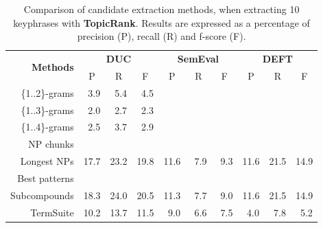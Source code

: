     \begin{table}[h]
      \centering
      \begin{tabular}{rccccccccc}
        \toprule
        \multirow{2}{*}[-2pt]{\textbf{Methods}} & \multicolumn{3}{c}{\textbf{DUC}} & \multicolumn{3}{c}{\textbf{SemEval}} & \multicolumn{3}{c}{\textbf{DEFT}}\\
        \cmidrule(r){2-4}\cmidrule(lr){5-7}\cmidrule(l){8-10}
        & P & R & F & P & R & F & P & R & F\\
        \midrule
        \{1..2\}-grams & $~~$3.9 & $~~$5.4 & $~~$4.5 & & & & & &\\
        \{1..3\}-grams & $~~$2.0 & $~~$2.7 & $~~$2.3 & & & & & &\\
        \{1..4\}-grams & $~~$2.5 & $~~$3.7 & $~~$2.9 & & & & & &\\
        NP chunks & & & & & & & & &\\
        Longest NPs & 17.7 & 23.2 & 19.8 & 11.6 & $~~$7.9 & $~~$9.3 & 11.6 & 21.5 & 14.9\\
        Best patterns & & & & & & & & &\\
        Subcompounds & 18.3 & 24.0 & 20.5 & 11.3 & $~~$7.7 & $~~$9.0 & 11.6 & 21.5 & 14.9\\
        TermSuite & 10.2 & 13.7 & 11.5 & $~~$9.0 & $~~$6.6 & $~~$7.5 & $~~$4.0 & $~~$7.8 & $~~$5.2\\
        \bottomrule
      \end{tabular}
      \caption{Comparison of candidate extraction methods, when extracting 10
               keyphrases with \textbf{TopicRank}. Results are expressed as a
               percentage of precision (P), recall (R) and f-score (F).
               \label{tab:keyphrase_extraction_results}}
    \end{table}

